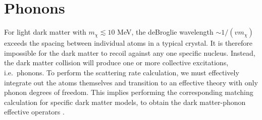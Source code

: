 \documentclass{moriond}
\begin{document}
%




\section{Phonons\label{sec:phonons}}

For light dark matter with $m_\chi\lesssim 10$ MeV, the deBroglie wavelength $\sim 1/(v m_\chi)$ exceeds the spacing between individual atoms in a typical crystal. It is therefore impossible for the dark matter to recoil against any one specific nucleus. Instead, the dark matter collision will produce one or more collective excitations, i.e.~phonons. To perform the scattering rate calculation, we must effectively integrate out the atoms themselves and transition to an effective theory with only phonon degrees of freedom. This implies performing the corresponding matching calculation for specific dark matter models, to obtain the dark matter-phonon effective operators \cite{Knapen:2017ekk,Griffin:2018bjn}. 
\end{document}
